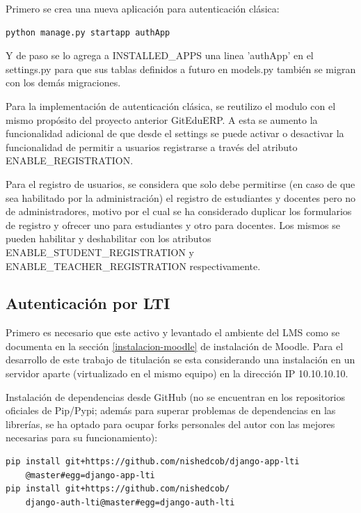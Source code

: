 Primero se crea una nueva aplicación para autenticación clásica:
\begin{lstlisting}
python manage.py startapp authApp
\end{lstlisting}

Y de paso se lo agrega a INSTALLED\_APPS una linea 'authApp' en el settings.py para que sus tablas definidos a futuro en models.py también se migran con los demás migraciones.

Para la implementación de autenticación clásica, se reutilizo el modulo con el mismo propósito del proyecto anterior GitEduERP. A esta se aumento la funcionalidad adicional de que desde el settings se puede activar o desactivar la funcionalidad de permitir a usuarios registrarse a través del atributo ENABLE\_REGISTRATION. 

Para el registro de usuarios, se considera que solo debe permitirse (en caso de que sea habilitado por la administración) el registro de estudiantes y docentes pero no de administradores, motivo por el cual se ha considerado duplicar los formularios de registro y ofrecer uno para estudiantes y otro para docentes. Los mismos se pueden habilitar y deshabilitar con los atributos ENABLE\_STUDENT\_REGISTRATION y ENABLE\_TEACHER\_REGISTRATION respectivamente.

\subsection{Autenticación por LTI}

Primero es necesario que este activo y levantado el ambiente del LMS  como se documenta en la sección \ref{instalacion-moodle} de instalación de Moodle. Para el desarrollo de este trabajo de titulación se esta considerando una instalación en un servidor aparte (virtualizado en el mismo equipo) en la dirección IP 10.10.10.10.


Instalación de dependencias desde GitHub (no se encuentran en los repositorios oficiales de Pip/Pypi; además para superar problemas de dependencias en las librerías, se ha optado para ocupar forks personales del autor con las mejores necesarias para su funcionamiento):
\begin{lstlisting}
pip install git+https://github.com/nishedcob/django-app-lti
    @master#egg=django-app-lti
pip install git+https://github.com/nishedcob/
    django-auth-lti@master#egg=django-auth-lti
\end{lstlisting}

